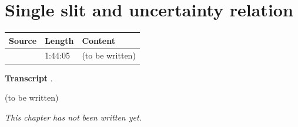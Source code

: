 \chapter{Single slit and uncertainty relation}\label{ch:c04}
\begin{paracol}{2}

\begin{sources}
\begin{tabularx}{\linewidth}{@{}l l L@{}}
\toprule
\textbf{Source} & \textbf{Length} & \textbf{Content}\\
\midrule
{} & 1:44:05 & (to be written)\\
\bottomrule
\end{tabularx}

\smallskip
\textbf{Transcript} .
\end{sources}

\begin{reading}
(to be written)
\end{reading}

\emph{This chapter has not been written yet.}

\flushside
\end{paracol}
